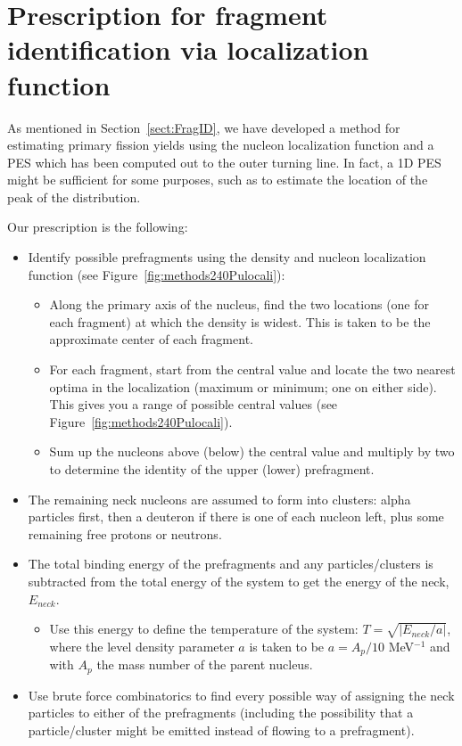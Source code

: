 \chapter{Prescription for fragment identification via localization function}\label{append:Fragments}
As mentioned in Section~\ref{sect:FragID}, we have developed a method for estimating primary fission yields using the nucleon localization function and a PES which has been computed out to the outer turning line. In fact, a 1D PES might be sufficient for some purposes, such as to estimate the location of the peak of the distribution.

Our prescription is the following:

\begin{itemize}
	\item Identify possible prefragments using the density and nucleon localization function (see Figure~\ref{fig:methods240Pulocali}):
	\begin{itemize}
		\item Along the primary axis of the nucleus, find the two locations (one for each fragment) at which the density is widest. This is taken to be the approximate center of each fragment.
		\item For each fragment, start from the central value and locate the two nearest optima in the localization (maximum or minimum; one on either side). This gives you a range of possible central values (see Figure~\ref{fig:methods240Pulocali}).
		\item Sum up the nucleons above (below) the central value and multiply by two to determine the identity of the upper (lower) prefragment.
	\end{itemize}
	\item The remaining neck nucleons are assumed to form into clusters: alpha particles first, then a deuteron if there is one of each nucleon left, plus some remaining free protons or neutrons.
	\item The total binding energy of the prefragments and any particles/clusters is subtracted from the total energy of the system to get the energy of the neck, $E_{neck}$.
	\begin{itemize}
		\item Use this energy to define the temperature of the system: $T = \sqrt{\left|E_{neck}/a\right|}$, where the level density parameter $a$ is taken to be $a=A_p/10$ MeV$^{-1}$ and with $A_p$ the mass number of the parent nucleus.
	\end{itemize}
	\item Use brute force combinatorics to find every possible way of assigning the neck particles to either of the prefragments (including the possibility that a particle/cluster might be emitted instead of flowing to a prefragment).

\end{itemize}
